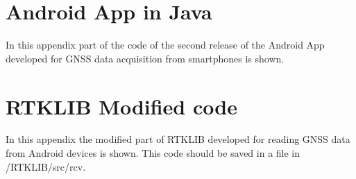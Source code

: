\documentclass{disithesis}
\begin{document}

\tableofcontents	
\listoffigures
\listoftables








%

\appendix
\chapter{Android App in Java}\label{appendix:androidcode}
In this appendix part of the code of the second release of the Android App developed for GNSS data acquisition from smartphones is shown. 
\\


\chapter{RTKLIB Modified code}\label{appendix:mrtklib_andr}
In this appendix the modified part of RTKLIB developed for reading GNSS data from Android devices is shown. This code should be saved in a file in /RTKLIB/src/rcv.
\\

\end{document}

